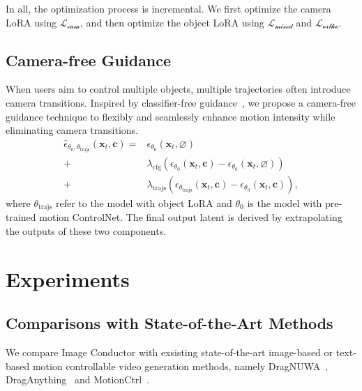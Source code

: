 \documentclass{article} %
\def\x{{\bm{x}}}
\def\c{{\bm{c}}}
\begin{document}
In all, the optimization process is incremental. We first optimize the camera LoRA using $\mathcal{L_\text{cam}}$, and then optimize the object LoRA using $\mathcal{L_\text{mixed}}$ and $\mathcal{L_\text{ortho}}$.





\subsection{Camera-free Guidance}
\label{Sec:3.5}
When users aim to control multiple objects, multiple trajectories often introduce camera transitions. Inspired by classifier-free guidance~\citep{ho2022classifier}, we propose a camera-free guidance technique to flexibly and seamlessly enhance motion intensity while eliminating camera transitions. 
\begin{equation}
\label{eq:cfg}
    \begin{aligned}
         \hat{\epsilon}_{\theta_0,\theta_\text{trajs}}(\x_t, \c) = & \epsilon_{\theta_0}(\x_t, \varnothing) \\
        +\ & \lambda_{\text{cfg}} (\epsilon_{\theta_0}(\x_t, \c) - \epsilon_{\theta_0}(\x_t, \varnothing)) \\
       +\ & \lambda_{\text{trajs}}(\epsilon_{\theta_{\text{trajs}}}(\x_t, \c) - \epsilon_{\theta_0}(\x_t, \c)),
    \end{aligned}
\end{equation}
where $\theta_\text{trajs}$ refer to the model with object LoRA and $\theta_0$ is the model with pre-trained motion ControlNet. The final output latent is derived by extrapolating the outputs of these two components.


\section{Experiments}








\subsection{Comparisons with State-of-the-Art Methods}
We compare Image Conductor with exsisting state-of-the-art image-based or text-based motion controllable video generation methods, namely DragNUWA~\citep{yin2023dragnuwa}, DragAnything~\citep{wu2024draganything} and MotionCtrl~\citep{wang2023motionctrl}. 
\end{document}
